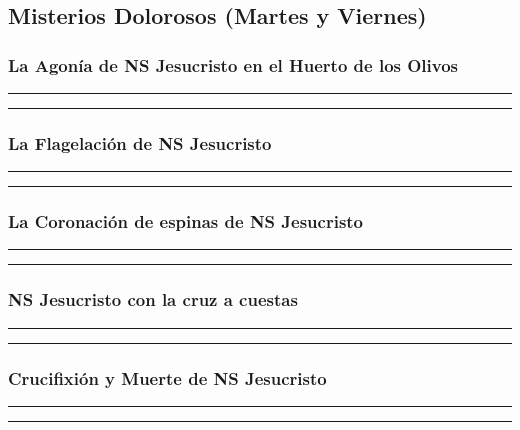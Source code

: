\documentclass[11pt,a4paper]{report}
\begin{document}
    

    \subsection*{Misterios Dolorosos (Martes y Viernes)}

    \subsubsection*{La Agonía de NS Jesucristo en el Huerto de los Olivos}
    
    
    \rule{\textwidth}{0.5pt}
    
    \rule{\textwidth}{0.5pt}
    

    \subsubsection*{La Flagelación de NS Jesucristo}
    
    
    \rule{\textwidth}{0.5pt}
    
    \rule{\textwidth}{0.5pt}
    

    \subsubsection*{La Coronación de espinas de NS Jesucristo}
    
    
    \rule{\textwidth}{0.5pt}
    
    \rule{\textwidth}{0.5pt}
    

    \subsubsection*{NS Jesucristo con la cruz a cuestas}
    
    
    \rule{\textwidth}{0.5pt}
    
    \rule{\textwidth}{0.5pt}
    

    \subsubsection*{Crucifixión y Muerte de NS Jesucristo}
    
    
    \rule{\textwidth}{0.5pt}
    
    \rule{\textwidth}{0.5pt}
    
\end{document}
